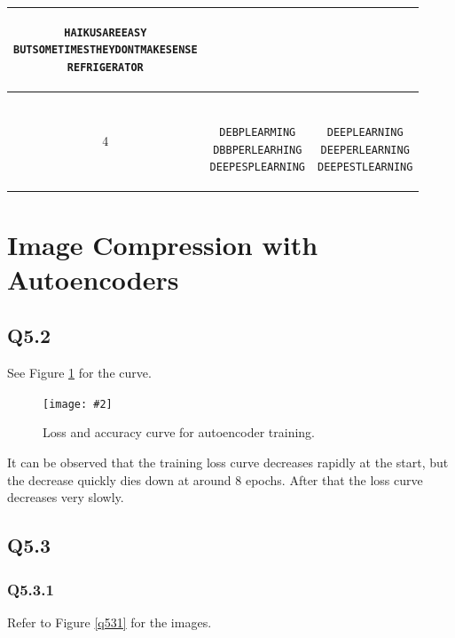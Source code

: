 \documentclass{article} %
\newcommand{\imgl}[4][0.3]{    
    \begin{figure}[H]
        \centering
        \texttt{[image: \#2]}
        \caption{#3}
        \label{#4}
    \end{figure}
}
\begin{document}
\begin{tabular}{||c||c|c||}
\begin{minipage}{0.4\textwidth}
\begin{verbatim}
HAIKUSAREEASY
BUTSOMETIMESTHEYDONTMAKESENSE
REFRIGERATOR

\end{verbatim}\end{minipage} \\
\hline
4 &
\begin{minipage}{0.4\textwidth}\begin{verbatim}

DEBPLEARMING
DBBPERLEARHING
DEEPESPLEARNING

\end{verbatim}\end{minipage}
        &
\begin{minipage}{0.4\textwidth}\begin{verbatim}

DEEPLEARNING
DEEPERLEARNING
DEEPESTLEARNING

\end{verbatim}\end{minipage} \\
    \hline\hline
    \end{tabular}

    \section{Image Compression with Autoencoders}
    \subsection*{Q5.2}
    See Figure \ref{q52} for the curve.
    \medskip

    \imgl{5,2 loss curve.png}{Loss and accuracy curve for autoencoder training.}{q52}

    It can be observed that the training loss curve decreases rapidly at the start, but the decrease quickly dies down at around 8 epochs. After that the loss curve decreases very slowly. 

    \subsection*{Q5.3}
    
    \subsubsection*{Q5.3.1}

    Refer to Figure \ref{q531} for the images.
    \medskip
    
\end{document}
